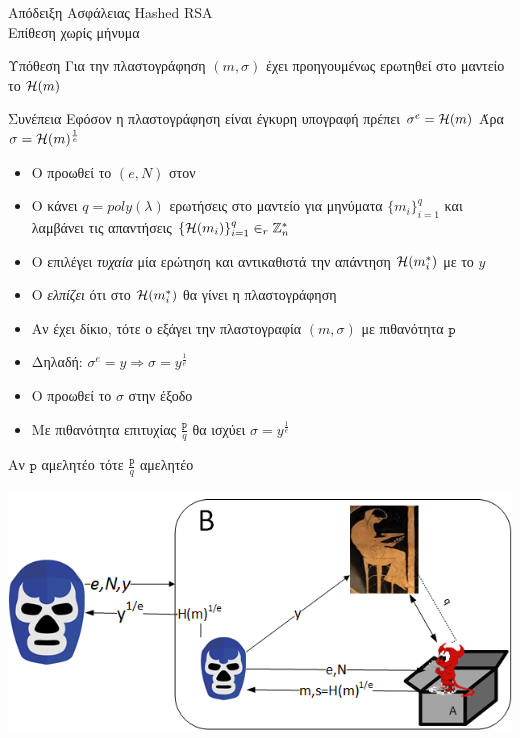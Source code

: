 \documentclass{beamer}
\begin{document}
\begin{frame}[allowframebreaks]{Απόδειξη Ασφάλειας Hashed RSA \\ Επίθεση χωρίς μήνυμα} 

\begin{block}{Υπόθεση}
Για την πλαστογράφηση $(m,\sigma)$ έχει προηγουμένως ερωτηθεί στο μαντείο το $\mathcal{H}(m)$
\end{block}

\begin{block}{Συνέπεια}
Εφόσον η πλαστογράφηση είναι έγκυρη υπογραφή πρέπει $\sigma^e = \mathcal{H}(m)$
Άρα $\sigma = \mathcal{H}(m)^{\frac{1}{e}}$
\end{block}

\framebreak

\begin{itemize}
\item Ο \advb προωθεί το $(e,N)$ στον \adv
\item O \adv κάνει $q=poly(\lambda)$ ερωτήσεις στο μαντείο για μηνύματα $\{m_i\}_{i=1}^q$ και λαμβάνει τις απαντήσεις $\{\mathcal{H}(m_i)\}_{i=1}^q \in_r \mathbb{Z}^*_n$
\item Ο \advb επιλέγει \emph{τυχαία} μία ερώτηση και αντικαθιστά την απάντηση $\mathcal{H}(m_i^*)$ με το $y$
\item Ο \advb \emph{ελπίζει} ότι στο $\mathcal{H}(m_i^*)$ θα γίνει η πλαστογράφηση
\item Αν έχει δίκιο, τότε ο \adv εξάγει την πλαστογραφία $(m,\sigma)$ με πιθανότητα $\mathtt{p}$
\item Δηλαδή: $\sigma^e = y \Rightarrow \sigma = y^\frac{1}{e}$
\item Ο \advb προωθεί το $\sigma$ στην έξοδο
\item Με πιθανότητα επιτυχίας $\frac{\mathtt{p}}{q}$ θα ισχύει $\sigma = y^\frac{1}{e}$
\end{itemize}

\begin{center}
Αν $\mathrm{\mathtt{p}}$ αμελητέο τότε $\frac{\mathtt{p}}{q}$ αμελητέο
\end{center}

\framebreak
\begin{center}
\includegraphics[scale=0.7]{ro-nom.png}
\end{center}
\end{frame}
\end{document}
